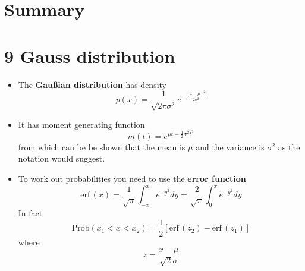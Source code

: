 \ifind
\section*{Summary}
\else
\section*{9 Gauss distribution}
\fi

\begin{itemize}

\item The \textbf{Gau\ss{}ian distribution} has density
  \begin{equation}
p(x)=\frac{1}{\sqrt{2\pi\sigma^2}}e^{-\frac{(x-\mu)^2}{2\sigma^2}}
  \end{equation}

\item It has moment generating function
  \begin{equation}
m(t)= e^{\mu t + \frac{1}{2}\sigma^2 t^2}
  \end{equation}
  from which can be be shown that the mean is $\mu$ and the variance is $\sigma^2$ as the notation would suggest.

\item To work out probabilities you need to use the \textbf{error function}
  \begin{equation}
\mbox{erf}\,(x)=\frac{1}{\sqrt{\pi}}\int_{-x}^xe^{-y^2}dy=\frac{2}{\sqrt{\pi}}\int_0^xe^{-y^2}dy
  \end{equation}
  In fact
  \begin{equation}
\mbox{Prob}(x_1<x<x_2)=\frac{1}{2}[\mbox{erf}\,(z_2)-\mbox{erf}\,(z_1)]
  \end{equation}
  where
  \begin{equation}
z=\frac{x-\mu}{\sqrt{2}\sigma}
  \end{equation}
  \end{itemize}
